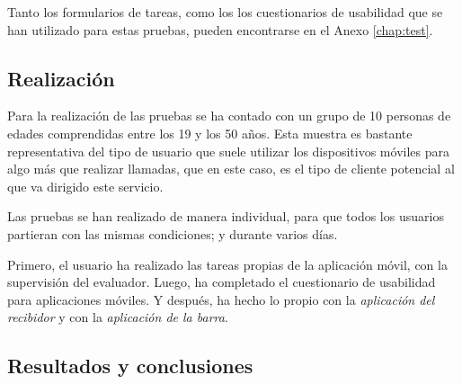 Tanto los formularios de tareas, como los los cuestionarios de usabilidad
que se han utilizado para estas pruebas, pueden encontrarse en el Anexo
\ref{chap:test}.

\subsection{Realización}
Para la realización de las pruebas se ha contado con un grupo de 10 personas
de edades comprendidas entre los 19 y los 50 años. Esta muestra es bastante
representativa del tipo de usuario que suele utilizar los dispositivos
móviles para algo más que realizar llamadas, que en este caso, es el tipo
de cliente potencial al que va dirigido este servicio.

Las pruebas se han realizado de manera individual, para que todos los usuarios
partieran con las mismas condiciones; y durante varios días.

Primero, el usuario ha realizado las tareas propias de la aplicación
móvil, con la supervisión del evaluador. Luego, ha completado el
cuestionario de usabilidad para aplicaciones móviles.
Y después, ha hecho lo propio con la \emph{aplicación del recibidor} y con la
\emph{aplicación de la barra}.

\subsection{Resultados y conclusiones}

